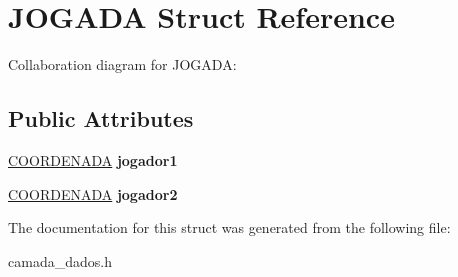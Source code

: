 \hypertarget{structJOGADA}{}\section{J\+O\+G\+A\+DA Struct Reference}
\label{structJOGADA}


Collaboration diagram for J\+O\+G\+A\+DA\+:
\subsection*{Public Attributes}
\begin{DoxyCompactItemize}
\item 
\mbox{\label{structJOGADA_a93d9306cb0c49b66b7d9a615bffe0149}} 
\hyperlink{structCOORDENADA}{C\+O\+O\+R\+D\+E\+N\+A\+DA} {\bfseries jogador1}
\item 
\mbox{\label{structJOGADA_ab46b16dfbdc7f2af9430c8dcdac0914b}} 
\hyperlink{structCOORDENADA}{C\+O\+O\+R\+D\+E\+N\+A\+DA} {\bfseries jogador2}
\end{DoxyCompactItemize}


The documentation for this struct was generated from the following file\+:\begin{DoxyCompactItemize}
\item 
camada\+\_\+dados.\+h\end{DoxyCompactItemize}
